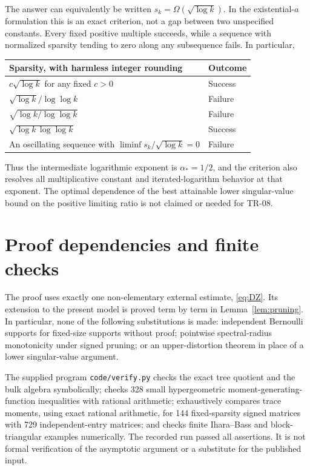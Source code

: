 \documentclass[11pt]{article}
\theoremstyle{definition}
\theoremstyle{remark}
\begin{document}
The answer can equivalently be written $s_k=\Omega(\sqrt{\log k})$. In the existential-$a$ formulation this is an exact criterion, not a gap between two unspecified constants. Every fixed positive multiple succeeds, while a sequence with normalized sparsity tending to zero along any subsequence fails. In particular,
\begin{center}
\begin{tabular}{@{}p{}p{}@{}}
\toprule
Sparsity, with harmless integer rounding & Outcome\\
\midrule
$c\sqrt{\log k}$ for any fixed $c>0$ & Success\\
$\sqrt{\log k}/\log\log k$ & Failure\\
$\sqrt{\log k/\log\log k}$ & Failure\\
$\sqrt{\log k\,\log\log k}$ & Success\\
An oscillating sequence with $\liminf s_k/\sqrt{\log k}=0$ & Failure\\
\bottomrule
\end{tabular}
\end{center}
Thus the intermediate logarithmic exponent is $\alpha_*=1/2$, and the criterion also resolves all multiplicative constant and iterated-logarithm behavior at that exponent. The optimal dependence of the best attainable lower singular-value bound on the positive limiting ratio is not claimed or needed for TR-08.

\appendix
\section{Proof dependencies and finite checks}

The proof uses exactly one non-elementary external estimate, \eqref{eq:DZ}. Its extension to the present model is proved term by term in Lemma~\ref{lem:pruning}. In particular, none of the following substitutions is made: independent Bernoulli supports for fixed-size supports without proof; pointwise spectral-radius monotonicity under signed pruning; or an upper-distortion theorem in place of a lower singular-value argument.

The supplied program \texttt{code/verify.py} checks the exact tree quotient and the bulk algebra symbolically; checks 328 small hypergeometric moment-generating-function inequalities with rational arithmetic; exhaustively compares trace moments, using exact rational arithmetic, for 144 fixed-sparsity signed matrices with 729 independent-entry matrices; and checks finite Ihara--Bass and block-triangular examples numerically. The recorded run passed all assertions. It is not formal verification of the asymptotic argument or a substitute for the published input.
\end{document}
